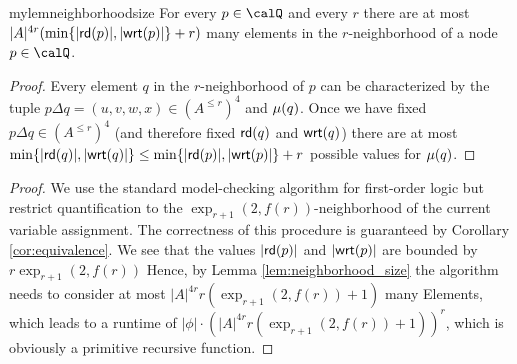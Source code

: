 \begin{appendix}
   \begin{restatable}{mylem}{neighborhoodsize}\label{lem:neighborhood_size}
   	For every $p\in \Qx$ and every $r$ there are at most $|A|^{4r} (\min\{|\mathsf{rd}(p)|, |\mathsf{wrt}(p)|\} + r)$ many elements in the $r$-neighborhood of a node $p\in \Qx$. 
   \end{restatable}
   \begin{proof}
   	Every element $q$ in the $r$-neighborhood of $p$ can be characterized by the tuple $p\Delta q = (u,v, w, x)\in (A^{\leq r})^4$ and $\mu(q)$. Once we have fixed  
   	$p\Delta q \in (A^{\leq r})^4$ (and therefore fixed $\mathsf{rd}(q)$ and $\mathsf{wrt}(q)$) there are at most $\min\{ |\mathsf{rd}(q)|, |\mathsf{wrt}(q)| \} \leq \min\{ |\mathsf{rd}(p)|, |\mathsf{wrt}(p)| \} + r$ possible values for $\mu(q)$.
   \end{proof}

	\decidable*
	\begin{proof}
		We use the standard model-checking algorithm for first-order logic but restrict quantification to the $\exp_{r+1}(2,f(r))$-neighborhood of the current variable assignment. The correctness of this procedure is guaranteed by Corollary \ref{cor:equivalence}.
		We see that the values $|\mathsf{rd}(p)|$ and $|\mathsf{wrt}(p)|$ are bounded by $r\exp_{r+1}(2,f(r))$
		Hence, by Lemma \ref{lem:neighborhood_size} the algorithm needs to consider at most $|A|^{4r} r(\exp_{r+1}(2,f(r)) +1)$ many Elements, which leads to a runtime of
		$|\phi| \cdot (|A|^{4r} r(\exp_{r+1}(2,f(r)) +1))^r$, which is obviously a primitive recursive function. 
	\end{proof}
\end{appendix}
